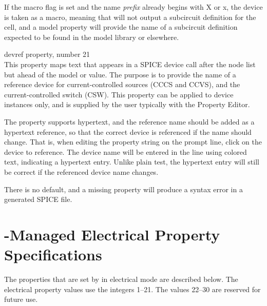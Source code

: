 \begin{description}
If the {\vt macro} flag is set and the name {\it prefix} already
begins with {\vt X} or {\vt x}, the device is taken as a macro,
meaning that {\Xic} will not output a subcircuit definition for the
cell, and a {\et model} property will provide the name of a subcircuit
definition expected to be found in the model library or elsewhere.

\item{\vt devref} property, number 21\\
This property maps text that appears in a SPICE device call after the
node list but ahead of the model or value.  The purpose is to provide
the name of a reference device for current-controlled sources (CCCS
and CCVS), and the current-controlled switch (CSW).  This property
can be applied to device instances only, and is supplied by the user
typically with the {\cb Property Editor}.

The property supports hypertext, and the reference name should be
added as a hypertext reference, so that the correct device is
referenced if the name should change.  That is, when editing the
property string on the prompt line, click on the device to reference. 
The device name will be entered in the line using colored text,
indicating a hypertext entry.  Unlike plain test, the hypertext entry
will still be correct if the referenced device name changes.
  
There is no default, and a missing property will produce a syntax
error in a generated SPICE file.
\end{description}


\section{{\Xic}-Managed Electrical Property Specifications}
\label{branchprop}

The properties that are set by {\Xic} in electrical mode are described
below.  The electrical property values use the integers 1--21.  The
values 22--30 are reserved for future use.

